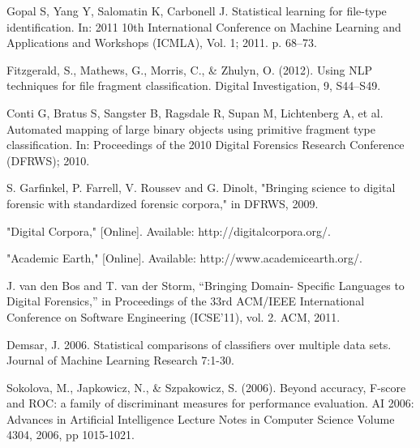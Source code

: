 Gopal S, Yang Y, Salomatin K, Carbonell J. Statistical learning for file-type identification. In: 2011 10th International Conference on Machine Learning and Applications and Workshops (ICMLA), Vol. 1; 2011. p. 68–73.

Fitzgerald, S., Mathews, G., Morris, C., \& Zhulyn, O. (2012). Using NLP techniques for file fragment classification. Digital Investigation, 9, S44–S49.

Conti G, Bratus S, Sangster B, Ragsdale R, Supan M, Lichtenberg A, et al. Automated mapping of large binary objects using primitive fragment type classification. In: Proceedings of the 2010 Digital Forensics Research Conference (DFRWS); 2010.

S. Garfinkel, P. Farrell, V. Roussev and G. Dinolt, "Bringing science to digital forensic with standardized forensic corpora," in DFRWS, 2009.

"Digital Corpora," [Online]. Available: http://digitalcorpora.org/.

"Academic Earth," [Online]. Available: http://www.academicearth.org/.

J. van den Bos and T. van der Storm, “Bringing Domain- Specific Languages to Digital Forensics,” in Proceedings of the 33rd ACM/IEEE International Conference on Software Engineering (ICSE’11), vol. 2. ACM, 2011.

Demsar, J. 2006. Statistical comparisons of classifiers over multiple data sets. Journal of Machine Learning Research 7:1-30.

Sokolova, M., Japkowicz, N., \& Szpakowicz, S. (2006). Beyond accuracy, F-score and ROC: a family of discriminant measures for performance evaluation. AI 2006: Advances in Artificial Intelligence Lecture Notes in Computer Science Volume 4304, 2006, pp 1015-1021.